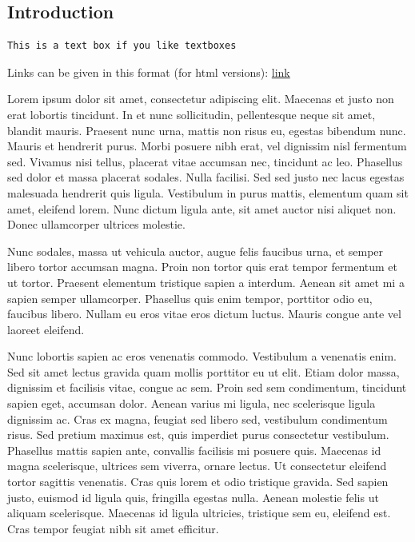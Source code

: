 \documentclass[]{elsarticle} %
\begin{document}
\newpage

\hypertarget{introduction}{%
\subsection{Introduction}\label{introduction}}

\begin{verbatim}
This is a text box if you like textboxes
\end{verbatim}

Links can be given in this format (for html versions):
\href{https://www.ncbi.nlm.nih.gov/pmc/articles/PMC6852019/}{link}

Lorem ipsum dolor sit amet, consectetur adipiscing elit. Maecenas et
justo non erat lobortis tincidunt. In et nunc sollicitudin, pellentesque
neque sit amet, blandit mauris. Praesent nunc urna, mattis non risus eu,
egestas bibendum nunc. Mauris et hendrerit purus. Morbi posuere nibh
erat, vel dignissim nisl fermentum sed. Vivamus nisi tellus, placerat
vitae accumsan nec, tincidunt ac leo. Phasellus sed dolor et massa
placerat sodales. Nulla facilisi. Sed sed justo nec lacus egestas
malesuada hendrerit quis ligula. Vestibulum in purus mattis, elementum
quam sit amet, eleifend lorem. Nunc dictum ligula ante, sit amet auctor
nisi aliquet non. Donec ullamcorper ultrices molestie.

Nunc sodales, massa ut vehicula auctor, augue felis faucibus urna, et
semper libero tortor accumsan magna. Proin non tortor quis erat tempor
fermentum et ut tortor. Praesent elementum tristique sapien a interdum.
Aenean sit amet mi a sapien semper ullamcorper. Phasellus quis enim
tempor, porttitor odio eu, faucibus libero. Nullam eu eros vitae eros
dictum luctus. Mauris congue ante vel laoreet eleifend.

Nunc lobortis sapien ac eros venenatis commodo. Vestibulum a venenatis
enim. Sed sit amet lectus gravida quam mollis porttitor eu ut elit.
Etiam dolor massa, dignissim et facilisis vitae, congue ac sem. Proin
sed sem condimentum, tincidunt sapien eget, accumsan dolor. Aenean
varius mi ligula, nec scelerisque ligula dignissim ac. Cras ex magna,
feugiat sed libero sed, vestibulum condimentum risus. Sed pretium
maximus est, quis imperdiet purus consectetur vestibulum. Phasellus
mattis sapien ante, convallis facilisis mi posuere quis. Maecenas id
magna scelerisque, ultrices sem viverra, ornare lectus. Ut consectetur
eleifend tortor sagittis venenatis. Cras quis lorem et odio tristique
gravida. Sed sapien justo, euismod id ligula quis, fringilla egestas
nulla. Aenean molestie felis ut aliquam scelerisque. Maecenas id ligula
ultricies, tristique sem eu, eleifend est. Cras tempor feugiat nibh sit
amet efficitur.
\end{document}
